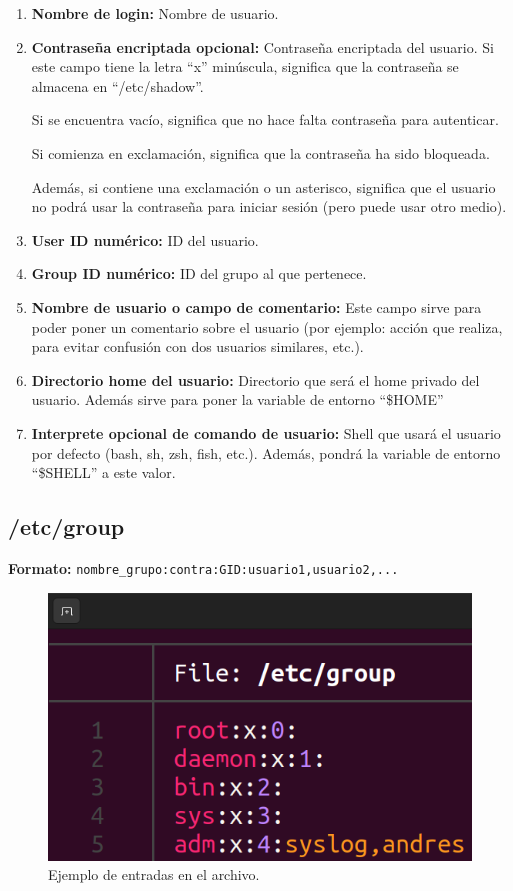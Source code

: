 \documentclass{article}
\begin{document}
\begin{enumerate}
    \item \textbf{Nombre de login: }Nombre de usuario.
    \item \textbf{Contraseña encriptada opcional: }Contraseña encriptada del usuario.
    Si este campo tiene la letra ``x'' minúscula, significa que la contraseña se almacena en ``/etc/shadow''.

    Si se encuentra vacío, significa que no hace falta contraseña para autenticar.

    Si comienza en exclamación, significa que la contraseña ha sido bloqueada.

    Además, si contiene una exclamación o un asterisco, significa que el usuario no podrá usar la contraseña para iniciar sesión (pero puede usar otro medio).

    \item \textbf{User ID numérico: }ID del usuario.
    \item \textbf{Group ID numérico: }ID del grupo al que pertenece.
    \item \textbf{Nombre de usuario o campo de comentario: }Este campo sirve para poder poner un comentario sobre el usuario (por ejemplo: acción que realiza, para evitar confusión con dos usuarios similares, etc.).
    \item \textbf{Directorio home del usuario: }Directorio que será el home privado del usuario. Además sirve para poner la variable de entorno ``\$HOME''
    \item \textbf{Interprete opcional de comando de usuario: }Shell que usará el usuario por defecto (bash, sh, zsh, fish, etc.). Además, pondrá la variable de entorno ``\$SHELL'' a este valor.
\end{enumerate}

\subsection*{/etc/group}
\textbf{Formato: }\verb|nombre_grupo:contra:GID:usuario1,usuario2,...|

\begin{figure}[H]
    \includegraphics[width=\textwidth]{imagenes/groupfile.png}
    \caption{Ejemplo de entradas en el archivo.}    
\end{figure}
\end{document}
